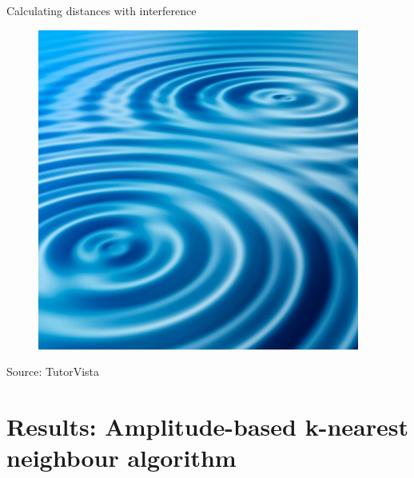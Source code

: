 \documentclass[10pt]{beamer}
\begin{document}
{
\begin{frame}[fragile]{Calculating distances with interference}

\begin{figure}[ht]
\includegraphics[scale=0.5]{wave-interference.png}
\end{figure}
\centering
\tiny{Source: TutorVista}

\end{frame}
}

\section{Results: Amplitude-based k-nearest neighbour algorithm}
\end{document}
